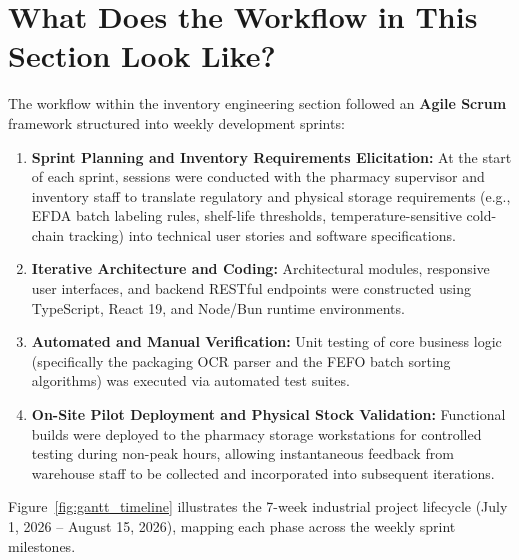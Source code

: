 \section{What Does the Workflow in This Section Look Like?}
The workflow within the inventory engineering section followed an \textbf{Agile Scrum} framework structured into weekly development sprints:
\begin{enumerate}
    \item \textbf{Sprint Planning and Inventory Requirements Elicitation:} At the start of each sprint, sessions were conducted with the pharmacy supervisor and inventory staff to translate regulatory and physical storage requirements (e.g., EFDA batch labeling rules, shelf-life thresholds, temperature-sensitive cold-chain tracking) into technical user stories and software specifications.
    \item \textbf{Iterative Architecture and Coding:} Architectural modules, responsive user interfaces, and backend RESTful endpoints were constructed using TypeScript, React 19, and Node/Bun runtime environments.
    \item \textbf{Automated and Manual Verification:} Unit testing of core business logic (specifically the packaging OCR parser and the FEFO batch sorting algorithms) was executed via automated test suites.
    \item \textbf{On-Site Pilot Deployment and Physical Stock Validation:} Functional builds were deployed to the pharmacy storage workstations for controlled testing during non-peak hours, allowing instantaneous feedback from warehouse staff to be collected and incorporated into subsequent iterations.
\end{enumerate}

Figure~\ref{fig:gantt_timeline} illustrates the 7-week industrial project lifecycle (July 1, 2026 -- August 15, 2026), mapping each phase across the weekly sprint milestones.

